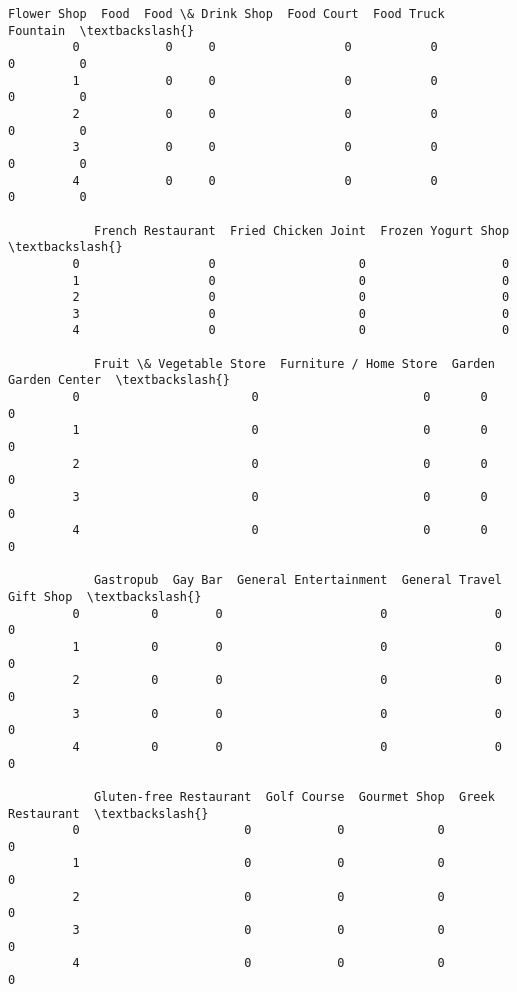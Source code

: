 \documentclass[11pt]{article}
\begin{document}
\begin{Verbatim}[commandchars=\\\{\}]
            Flower Shop  Food  Food \& Drink Shop  Food Court  Food Truck  Fountain  \textbackslash{}
         0            0     0                  0           0           0         0   
         1            0     0                  0           0           0         0   
         2            0     0                  0           0           0         0   
         3            0     0                  0           0           0         0   
         4            0     0                  0           0           0         0   
         
            French Restaurant  Fried Chicken Joint  Frozen Yogurt Shop  \textbackslash{}
         0                  0                    0                   0   
         1                  0                    0                   0   
         2                  0                    0                   0   
         3                  0                    0                   0   
         4                  0                    0                   0   
         
            Fruit \& Vegetable Store  Furniture / Home Store  Garden  Garden Center  \textbackslash{}
         0                        0                       0       0              0   
         1                        0                       0       0              0   
         2                        0                       0       0              0   
         3                        0                       0       0              0   
         4                        0                       0       0              0   
         
            Gastropub  Gay Bar  General Entertainment  General Travel  Gift Shop  \textbackslash{}
         0          0        0                      0               0          0   
         1          0        0                      0               0          0   
         2          0        0                      0               0          0   
         3          0        0                      0               0          0   
         4          0        0                      0               0          0   
         
            Gluten-free Restaurant  Golf Course  Gourmet Shop  Greek Restaurant  \textbackslash{}
         0                       0            0             0                 0   
         1                       0            0             0                 0   
         2                       0            0             0                 0   
         3                       0            0             0                 0   
         4                       0            0             0                 0   
         

\end{Verbatim}
\end{document}
